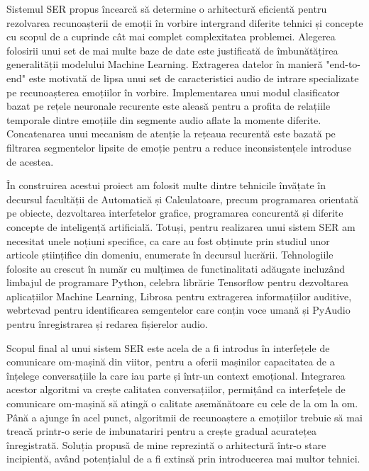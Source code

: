 \documentclass[a4paper,12pt]{book}
\begin{document}
		Sistemul SER propus încearcă să determine o arhitectură eficientă pentru rezolvarea recunoașterii de emoții în vorbire intergrand diferite tehnici și concepte cu scopul de a cuprinde cât mai complet complexitatea problemei. Alegerea folosirii unui set de mai multe baze de date este justificată de îmbunătățirea generalității modelului Machine Learning. Extragerea datelor în manieră "end-to-end" este motivată de lipsa unui set de caracteristici audio de intrare specializate pe recunoașterea emoțiilor în vorbire. Implementarea unui modul clasificator bazat pe rețele neuronale recurente este aleasă pentru a profita de relațiile temporale dintre emoțiile din segmente audio aflate la momente diferite. Concatenarea unui mecanism de atenție la rețeaua recurentă este bazată pe filtrarea segmentelor lipsite de emoție pentru a reduce inconsistențele introduse de acestea. \par
		
		În construirea acestui proiect am folosit multe dintre tehnicile învățate în decursul facultății de Automatică și Calculatoare, precum programarea orientată pe obiecte, dezvoltarea interfetelor grafice, programarea concurentă și diferite concepte de inteligență artificială. Totuși, pentru realizarea unui sistem SER am necesitat unele noțiuni specifice, ca  care au fost obținute prin studiul unor articole științifice din domeniu, enumerate în decursul lucrării. Tehnologiile folosite au crescut în număr cu mulțimea de functinalitati adăugate incluzând limbajul de programare Python, celebra librărie Tensorflow pentru dezvoltarea aplicațiilor Machine Learning, Librosa \cite{librosa} pentru extragerea informațiilor auditive, webrtcvad \cite{vad} pentru identificarea semgentelor care conțin voce umană și PyAudio \cite{pyaudio} pentru înregistrarea și redarea fișierelor audio. \par
		
		Scopul final al unui sistem SER este acela de a fi introdus în interfețele de comunicare om-mașină din viitor, pentru a oferii mașinilor capacitatea de a înțelege conversațiile la care iau parte și într-un context emoțional. Integrarea acestor algoritmi va crește calitatea conversațiilor, permițând ca interfețele de comunicare om-mașină să atingă o calitate asemănătoare cu cele de la om la om. Până a ajunge în acel punct, algoritmii de recunoaștere a emoțiilor trebuie să mai treacă printr-o serie de imbunatariri pentru a crește gradual acuratețea înregistrată. Soluția propusă de mine reprezintă o arhitectură într-o stare incipientă, având potențialul de a fi extinsă prin introducerea mai multor tehnici. \par
		
\end{document}
